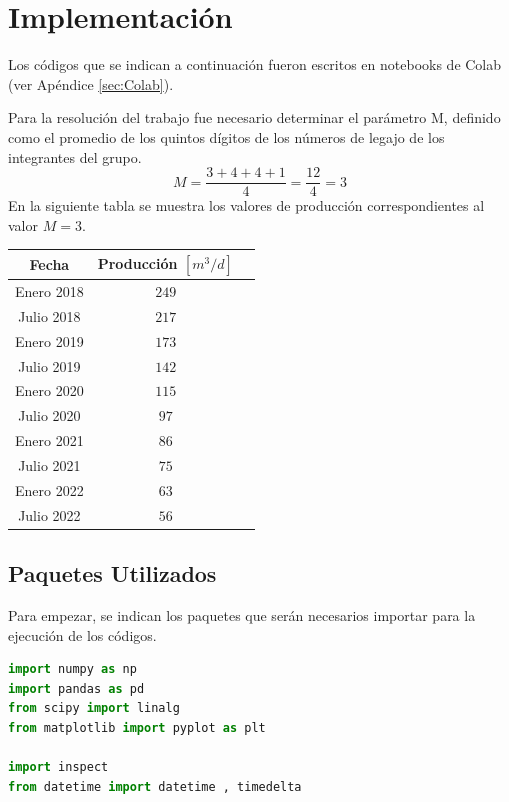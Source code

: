 
\chapter{Implementación}

Los códigos que se indican a continuación fueron escritos en notebooks de Colab (ver Apéndice \ref{sec:Colab}).

Para la resolución del trabajo fue necesario determinar el parámetro M, definido como el promedio de los quintos dígitos de los números de legajo de los integrantes del grupo.
\[
M=\frac{3+4+4+1}{4}=\frac{12}{4}=3
\]
En la siguiente tabla se muestra los valores de producción correspondientes al valor $M=3$.

\begin{table}[h] 
	\centering 
	\begin{tabular}{|c|c|c|}
		\toprule
		Fecha & Producción $[m^3/d]$  \\
		\midrule
		Enero 2018   & $249$ \\ \hline
		Julio 2018   & $217$ \\ \hline
		Enero 2019   & $173$ \\ \hline
		Julio 2019   & $142$ \\ \hline
		Enero 2020   & $115$ \\ \hline
		Julio 2020   & $97$ \\ \hline
		Enero 2021   & $86$ \\ \hline
		Julio 2021   & $75$  \\ \hline
		Enero 2022   & $63$  \\ \hline
		Julio 2022   & $56$  \\
		\bottomrule
	\end{tabular}
\end{table}

\section{Paquetes Utilizados}
Para empezar, se indican los paquetes que serán necesarios importar para la ejecución de los códigos.

\begin{lstlisting}[language=Python,frame=single,caption=Importación de paquetes,label={cod:paquete}]
import numpy as np
import pandas as pd
from scipy import linalg
from matplotlib import pyplot as plt

import inspect
from datetime import datetime , timedelta
\end{lstlisting}




